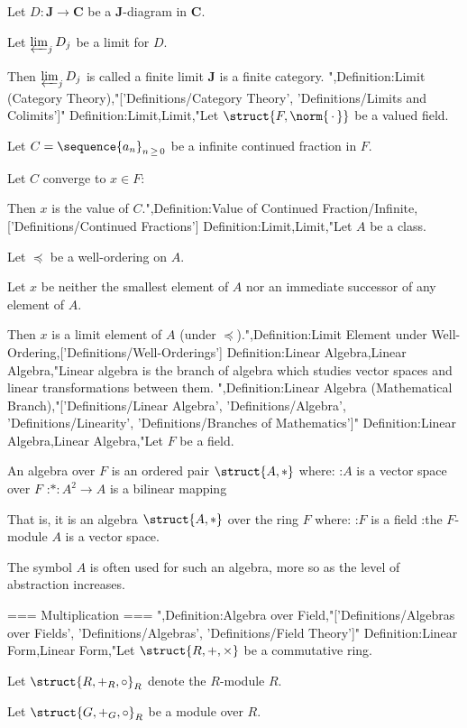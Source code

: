Let $D: \mathbf J \to \mathbf C$ be a $\mathbf J$-diagram in $\mathbf C$.

Let $\varprojlim_j D_j$ be a limit for $D$.


Then $\varprojlim_j D_j$ is called a finite limit  $\mathbf J$ is a finite category.
",Definition:Limit (Category Theory),"['Definitions/Category Theory', 'Definitions/Limits and Colimits']"
Definition:Limit,Limit,"Let $\struct {F, \norm {\,\cdot\,} }$ be a valued field.

Let $C = \sequence {a_n}_{n \mathop \ge 0}$ be a infinite continued fraction in $F$.


Let $C$ converge to $x \in F$:

Then $x$ is the value of $C$.",Definition:Value of Continued Fraction/Infinite,['Definitions/Continued Fractions']
Definition:Limit,Limit,"Let $A$ be a class.

Let $\preccurlyeq$ be a well-ordering on $A$.

Let $x$ be neither the smallest element of $A$ nor an immediate successor of any element of $A$.


Then $x$ is a limit element of $A$ (under $\preccurlyeq$).",Definition:Limit Element under Well-Ordering,['Definitions/Well-Orderings']
Definition:Linear Algebra,Linear Algebra,"Linear algebra is the branch of algebra which studies vector spaces and linear transformations between them.
",Definition:Linear Algebra (Mathematical Branch),"['Definitions/Linear Algebra', 'Definitions/Algebra', 'Definitions/Linearity', 'Definitions/Branches of Mathematics']"
Definition:Linear Algebra,Linear Algebra,"Let $F$ be a field.


An algebra over $F$ is an ordered pair $\struct {A, *}$ where:
:$A$ is a vector space over $F$
:$* : A^2 \to A$ is a bilinear mapping


That is, it is an algebra $\struct {A, *}$ over the ring $F$ where:
:$F$ is a field
:the $F$-module $A$ is a vector space.


The symbol $A$ is often used for such an algebra, more so as the level of abstraction increases.


=== Multiplication ===
",Definition:Algebra over Field,"['Definitions/Algebras over Fields', 'Definitions/Algebras', 'Definitions/Field Theory']"
Definition:Linear Form,Linear Form,"Let $\struct {R, +, \times}$ be a commutative ring.

Let $\struct {R, +_R, \circ}_R$ denote the $R$-module $R$.

Let $\struct {G, +_G, \circ}_R$ be a module over $R$.


